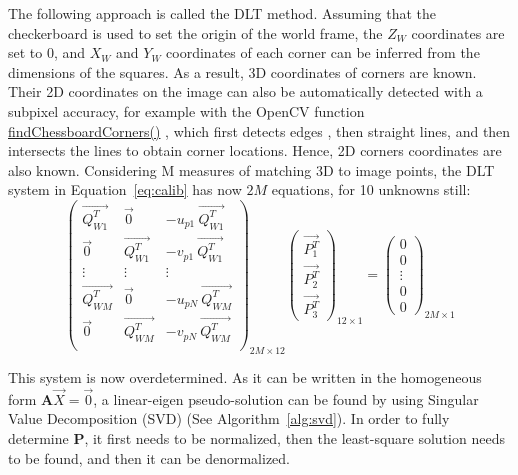 The following approach is called the DLT method. Assuming that the checkerboard is used to set the origin of the world frame, the $Z_W$ coordinates are set to 0, and $X_W$ and $Y_W$ coordinates of each corner can be inferred from the dimensions of the squares. As a result, 3D coordinates of corners are known. Their 2D coordinates on the image can also be automatically detected with a subpixel accuracy, for example with the OpenCV function \href{https://docs.opencv.org/4.x/d9/d0c/group__calib3d.html#ga93efa9b0aa890de240ca32b11253dd4a}{findChessboardCorners()} \cite{Bradski2000}, which first detects edges \cite{Canny1986}, then straight lines, and then intersects the lines to obtain corner locations. Hence, 2D corners coordinates are also known. Considering M measures of matching 3D to image points, the DLT system in Equation~\ref{eq:calib} has now $2M$ equations, for 10 unknowns still:
\begin{equation}
  \begin{pmatrix}
    \overrightarrow{Q_{W1}^T} & \overrightarrow{0} & - u_{p1} \ \overrightarrow{Q_{W1}^T}\\   
    \overrightarrow{0} & \overrightarrow{Q_{W1}^T} & - v_{p1} \ \overrightarrow{Q_{W1}^T} \\ 
    \vdots & \vdots & \vdots\\
    \overrightarrow{Q_{WM}^T} & \overrightarrow{0} & - u_{pN} \ \overrightarrow{Q_{WM}^T}\\   
    \overrightarrow{0} & \overrightarrow{Q_{WM}^T} & - v_{pN} \ \overrightarrow{Q_{WM}^T} \\ 
  \end{pmatrix}_{\!\!2M\times 12}
  \begin{pmatrix} \overrightarrow{P_1^T} \\ \overrightarrow{P_2^T} \\ \overrightarrow{P_3^T} \end{pmatrix}_{\!\!12\times 1}
  = \begin{pmatrix} 0 \\ 0 \\ \vdots \\ 0 \\ 0 \end{pmatrix}_{\!\!2M\times 1}
\end{equation}

This system is now overdetermined. As it can be written in the homogeneous form \(\textbf{A} \overrightarrow{X} = \overrightarrow{0}\), a linear-eigen pseudo-solution can be found \cite{Hartley2003} by using Singular Value Decomposition (SVD) \cite{Golub1971} (See Algorithm~\ref{alg:svd}). In order to fully determine $\textbf{P}$, it first needs to be normalized, then the least-square solution needs to be found, and then it can be denormalized. 

